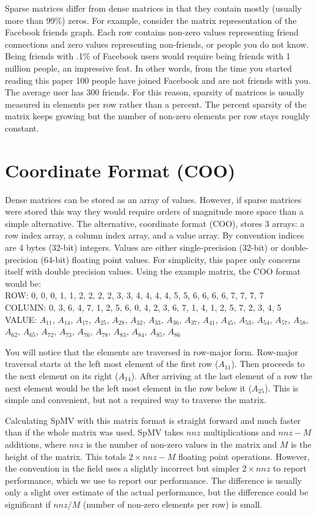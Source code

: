 \par Sparse matrices differ from dense matrices in that they contain mostly (usually more than 99\%) zeros. For example, consider the matrix representation of the Facebook friends graph. Each row contains non-zero values representing friend connections and zero values representing non-friends, or people you do not know. Being friends with .1\% of Facebook users would require being friends with 1 million people, an impressive feat. In other words, from the time you started reading this paper 100 people have joined Facebook and are not friends with you. The average user has 300 friends. For this reason, sparsity of matrices is usually measured in elements per row rather than a percent. The percent sparsity of the matrix keeps growing but the number of non-zero elements per row stays roughly constant.
\section{Coordinate Format (COO)}
\par Dense matrices can be stored as an array of values. However, if sparse matrices were stored this way they would require orders of magnitude more space than a simple alternative. The alternative, coordinate format (COO), stores 3 arrays: a row index array, a column index array, and a value array. By convention indices are 4 bytes (32-bit) integers. Values are either single-precision (32-bit) or double-precision (64-bit) floating point values. For simplicity, this paper only concerns itself with double precision values. Using the example matrix, the COO format would be:\\
ROW:    0, 0, 0, 1, 1, 2, 2, 2, 2, 3, 3, 4, 4, 4, 4, 5, 5, 6, 6, 6, 6, 7, 7, 7, 7 \\ 
COLUMN: 0, 3, 6, 4, 7, 1, 2, 5, 6, 0, 4, 2, 3, 6, 7, 1, 4, 1, 2, 5, 7, 2, 3, 4, 5\\ 
VALUE: $A_{11}$, $A_{14}$, $A_{17}$, $A_{25}$, $A_{28}$, $A_{32}$, $A_{33}$, $A_{36}$, $A_{37}$, $A_{41}$, $A_{45}$, $A_{53}$, $A_{54}$, $A_{57}$, $A_{58}$, $A_{62}$, $A_{65}$, $A_{72}$, $A_{73}$, $A_{76}$, $A_{78}$, $A_{83}$, $A_{84}$, $A_{85}$, $A_{86}$ \par
You will notice that the elements are traversed in row-major form. Row-major traversal starts at the left most element of the first row ($A_{11}$). Then proceeds to the next element on its right ($A_{14}$). After arriving at the last element of a row the next element would be the left most element in the row below it ($A_{25}$). This is simple and convenient, but not a required way to traverse the matrix. 
\par Calculating SpMV with this matrix format is straight forward and much faster than if the whole matrix was used. SpMV takes $nnz$ multiplications and $nnz-M$ additions, where $nnz$ is the number of non-zero values in the matrix and $M$ is the height of the matrix. This totals $2\times nnz - M$ floating point operations. However, the convention in the field uses a slightly incorrect but simpler $2\times nnz$ to report performance, which we use to report our performance. The difference is usually only a slight over estimate of the actual performance, but the difference could be significant if $nnz/M$ (number of non-zero elements per row) is small.
